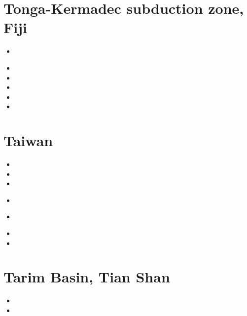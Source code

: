 \section{Tonga-Kermadec subduction zone, Fiji }

\begin{small}
\begin{itemize}
\item[\twothousandthree] 
 \\
\item[\twothousandsix] 
\item[\twothousandsixteen] 
\item[\twothousandseventeen] 
\item[\twothousandtwentyone] 
\item[\twothousandtwentythree] 
\end{itemize}
\end{small}

\section{Taiwan}

\begin{small}
\begin{itemize}
\item[\twothousandone]
\item[\twothousandsix]
\item[\twothousandeight]
\item[\twothousandnine]
 \\
\item[\twothousandsixteen]
 \\ 
\item[\twothousandnineteen]
\item[\twothousandtwenty]
\end{itemize}
\end{small}

\section{Tarim Basin, Tian Shan } 

\begin{small}
\begin{itemize}
\item[\nineteenninetyseven] 
\item[\twothousandtwentytwo] 
\end{itemize}
\end{small}


